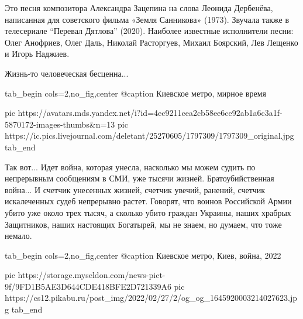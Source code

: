 Это песня композитора Александра Зацепина на слова Леонида Дербенёва, написанная
для советского фильма «Земля Санникова» (1973). Звучала также в телесериале
\enquote{Перевал Дятлова} (2020). Наиболее известные исполнители песни: Олег Анофриев,
Олег Даль, Николай Расторгуев, Михаил Боярский, Лев Лещенко и Игорь Наджиев.


Жизнь-то человеческая бесценна...

\ifcmt
  tab_begin cols=2,no_fig,center
		 @caption Киевское метро, мирное время

     pic https://avatars.mds.yandex.net/i?id=4ec9211cea2cb58ee6ce92ab1a6c3a1f-5870172-images-thumbs&n=13
		 pic https://ic.pics.livejournal.com/deletant/25270605/1797309/1797309_original.jpg
  tab_end
\fi

Так вот... Идет война, которая унесла, насколько мы можем судить по непрерывным
сообщениям в СМИ, уже тысячи жизней. Братоубийственная война... И счетчик
унесенных жизней, счетчик увечий, ранений, счетчик искалеченных судеб
непрерывно растет. Говорят, что воинов Российской Армии убито уже около трех
тысяч, а сколько убито граждан Украины, наших храбрых Защитников, наших
настоящих Богатырей, мы не знаем, но думаем, что тоже немало. 

\ifcmt
  tab_begin cols=2,no_fig,center
		 @caption Киевское метро, Киев, война, 2022

		 pic https://storage.myseldon.com/news-pict-9f/9FD1B5AE3D644CDE418BFE2D721339A6
     pic https://cs12.pikabu.ru/post_img/2022/02/27/2/og_og_1645920003214027623.jpg
  tab_end
\fi

